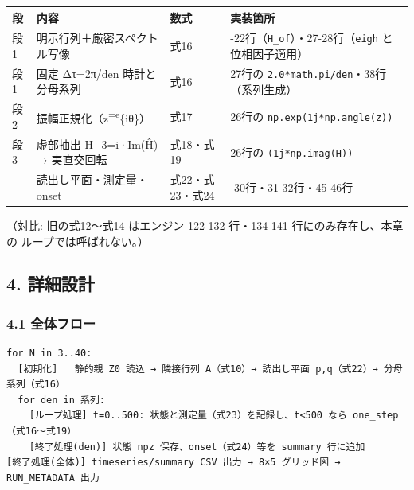 \documentclass[
  a4paper,
]{ltjsarticle}
\newcounter{none} %
\begin{document}
{\def\LTcaptype{none} %
\begin{longtable}[]{@{}
  >{\raggedright\arraybackslash}p{}
  >{\raggedright\arraybackslash}p{}
  >{\raggedright\arraybackslash}p{}
  >{\raggedright\arraybackslash}p{}@{}}
\toprule\noalign{}
\begin{minipage}[b]{\linewidth}\raggedright
段
\end{minipage} & \begin{minipage}[b]{\linewidth}\raggedright
内容
\end{minipage} & \begin{minipage}[b]{\linewidth}\raggedright
数式
\end{minipage} & \begin{minipage}[b]{\linewidth}\raggedright
実装箇所
\end{minipage} \\
\midrule\noalign{}
\endhead
\bottomrule\noalign{}
\endlastfoot
段1 & 明示行列＋厳密スペクトル写像 & 式16 &
21-22行（\texttt{H\_of}）・27-28行（\texttt{eigh} と位相因子適用） \\
段1 & 固定 Δτ=2π/den 時計と分母系列 & 式16 & 27行の
\texttt{2.0*math.pi/den}・38行（系列生成） \\
段2 & 振幅正規化（z\textsuperscript{=e}\{iθ\}） & 式17 & 26行の
\texttt{np.exp(1j*np.angle(z))} \\
段3 & 虚部抽出 H\_3=i·Im(Ĥ) → 実直交回転 & 式18・式19 & 26行の
\texttt{(1j*np.imag(H))} \\
--- & 読出し平面・測定量・onset & 式22・式23・式24 &
29-30行・31-32行・45-46行 \\
\end{longtable}
}

（対比: 旧の式12〜式14 はエンジン 122-132 行・134-141
行にのみ存在し、本章の ループでは呼ばれない。）

\subsection{4. 詳細設計}\label{ux8a73ux7d30ux8a2dux8a08}

\subsubsection{4.1 全体フロー}\label{ux5168ux4f53ux30d5ux30edux30fc}

\begin{verbatim}
for N in 3..40:
  [初期化]   静的親 Z0 読込 → 隣接行列 A（式10）→ 読出し平面 p,q（式22）→ 分母系列（式16）
  for den in 系列:
    [ループ処理] t=0..500: 状態と測定量（式23）を記録し、t<500 なら one_step（式16〜式19）
    [終了処理(den)] 状態 npz 保存、onset（式24）等を summary 行に追加
[終了処理(全体)] timeseries/summary CSV 出力 → 8×5 グリッド図 → RUN_METADATA 出力
\end{verbatim}
\end{document}
